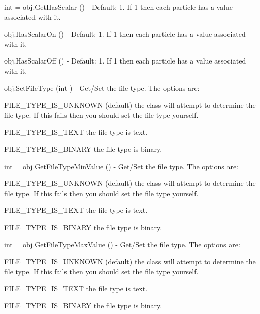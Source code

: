 \begin{DoxyItemize}
\item {\ttfamily int = obj.\-Get\-Has\-Scalar ()} -\/ Default\-: 1. If 1 then each particle has a value associated with it.  
\item {\ttfamily obj.\-Has\-Scalar\-On ()} -\/ Default\-: 1. If 1 then each particle has a value associated with it.  
\item {\ttfamily obj.\-Has\-Scalar\-Off ()} -\/ Default\-: 1. If 1 then each particle has a value associated with it.  
\item {\ttfamily obj.\-Set\-File\-Type (int )} -\/ Get/\-Set the file type. The options are\-:
\begin{DoxyItemize}
\item F\-I\-L\-E\-\_\-\-T\-Y\-P\-E\-\_\-\-I\-S\-\_\-\-U\-N\-K\-N\-O\-W\-N (default) the class will attempt to determine the file type. If this fails then you should set the file type yourself.
\item F\-I\-L\-E\-\_\-\-T\-Y\-P\-E\-\_\-\-I\-S\-\_\-\-T\-E\-X\-T the file type is text.
\item F\-I\-L\-E\-\_\-\-T\-Y\-P\-E\-\_\-\-I\-S\-\_\-\-B\-I\-N\-A\-R\-Y the file type is binary.  
\end{DoxyItemize}
\item {\ttfamily int = obj.\-Get\-File\-Type\-Min\-Value ()} -\/ Get/\-Set the file type. The options are\-:
\begin{DoxyItemize}
\item F\-I\-L\-E\-\_\-\-T\-Y\-P\-E\-\_\-\-I\-S\-\_\-\-U\-N\-K\-N\-O\-W\-N (default) the class will attempt to determine the file type. If this fails then you should set the file type yourself.
\item F\-I\-L\-E\-\_\-\-T\-Y\-P\-E\-\_\-\-I\-S\-\_\-\-T\-E\-X\-T the file type is text.
\item F\-I\-L\-E\-\_\-\-T\-Y\-P\-E\-\_\-\-I\-S\-\_\-\-B\-I\-N\-A\-R\-Y the file type is binary.  
\end{DoxyItemize}
\item {\ttfamily int = obj.\-Get\-File\-Type\-Max\-Value ()} -\/ Get/\-Set the file type. The options are\-:
\begin{DoxyItemize}
\item F\-I\-L\-E\-\_\-\-T\-Y\-P\-E\-\_\-\-I\-S\-\_\-\-U\-N\-K\-N\-O\-W\-N (default) the class will attempt to determine the file type. If this fails then you should set the file type yourself.
\item F\-I\-L\-E\-\_\-\-T\-Y\-P\-E\-\_\-\-I\-S\-\_\-\-T\-E\-X\-T the file type is text.
\item F\-I\-L\-E\-\_\-\-T\-Y\-P\-E\-\_\-\-I\-S\-\_\-\-B\-I\-N\-A\-R\-Y the file type is binary.  

\end{DoxyItemize}
\end{DoxyItemize}
